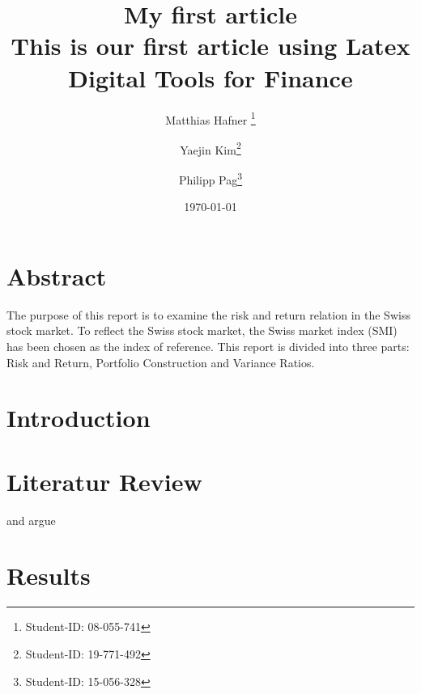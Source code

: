 \documentclass{article}
\begin{document}
	
	


\title{\Huge My first article  \\ \vspace*{0.5cm} \LARGE This is our first article using Latex \\ \vspace*{2cm} \Large \bf Digital Tools for Finance }
\author{Matthias Hafner \thanks{Student-ID: 08-055-741} \and Yaejin Kim\thanks{Student-ID: 19-771-492}  \and Philipp Pag\thanks{Student-ID: 15-056-328}}
\date{\today}
\maketitle
	
\vspace*{1cm}	
	
\section*{Abstract}

The purpose of this report is to examine the risk and return relation in the Swiss stock market. To reflect the Swiss stock market, the Swiss market index (SMI) has been chosen as the index of reference. This report is divided into three parts: Risk and Return, Portfolio Construction and Variance Ratios. \blindtext


\newpage


\tableofcontents
\newpage

\section{Introduction}
\blindtext
\newpage

\section{Literatur Review}

\cite{Milgrom1982} and \cite{Gormsen2020} argue \blindtext
\newpage

\section{Results}
\end{document}
